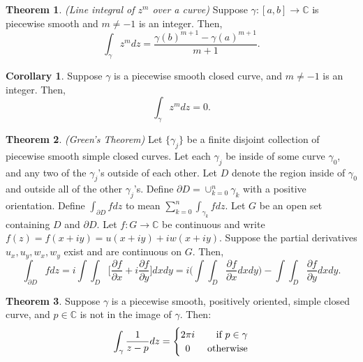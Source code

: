 \documentclass[a4paper]{article}
\theoremstyle{definition}
\newtheorem{theorem}{Theorem}
\newtheorem{corollary}{Corollary}
\begin{document}
	\begin{theorem}
		\emph{(Line integral of $z^{m}$ over a curve)}
		Suppose $\gamma : [a,b] \rightarrow \mathbb{C}$ is piecewise smooth and $m \neq -1$ is an integer. Then,
		$$\int_{\gamma} z^{m} dz = \frac{\gamma(b)^{m+1} - \gamma(a)^{m+1}}{m+1}.$$
	\end{theorem}
	
	\begin{corollary}
		Suppose $\gamma$ is a piecewise smooth closed curve, and $m \neq -1$ is an integer. Then,
		$$\int_{\gamma} z^{m} dz = 0.$$
	\end{corollary}
	
	\begin{theorem}
		\emph{(Green's Theorem)}
		Let $\{\gamma_{j}\}$ be a finite disjoint collection of piecewise smooth simple closed curves. Let each $\gamma_{j}$ be inside of some curve $\gamma_{0}$, and any two of the $\gamma_{j}$'s outside of each other. Let $D$ denote the region inside of $\gamma_{0}$ and outside all of the other $\gamma_{j}$'s. Define $\partial D = \cup_{k=0}^{n} \gamma_{k}$ with a positive orientation. Define $\int_{\partial D} f dz$ to mean $\sum_{k=0}^{n} \int_{\gamma_{k}} f dz$. Let $G$ be an open set containing $D$ and $\partial D$. Let $f : G \rightarrow \mathbb{C}$ be continuous and write $f(z) = f(x + iy) = u(x + iy)  + iw(x + iy)$. Suppose the partial derivatives $u_{x}, u_{y}, w_{x}, w_{y}$ exist and are continuous on $G$. Then,
		$$\int_{\partial D} f dz = i \int \int_{D} \bigg[\frac{\partial f}{\partial x} + i \frac{\partial f}{\partial y}\bigg] dxdy = i\bigg(\int \int_{D} \frac{\partial f}{\partial x} dxdy\bigg) - \int \int_{D} \frac{\partial f}{\partial y} dxdy.$$
	\end{theorem}
	
	\begin{theorem}
		Suppose $\gamma$ is a piecewise smooth, positively oriented, simple closed curve, and $p \in \mathbb{C}$ is not in the image of $\gamma$. Then:
		\begin{eqnarray*}
			\int_{\gamma} \frac{1}{z - p} dz = \left\{\def\arraystretch{1.2}%
			\begin{array}{@{}c@{\quad}r@{}}
				2 \pi i & \;\text{if $p \in \gamma$}\\
				0 & \;\text{otherwise}\\
			\end{array}\right.
		\end{eqnarray*}
	\end{theorem}
	
\end{document}

